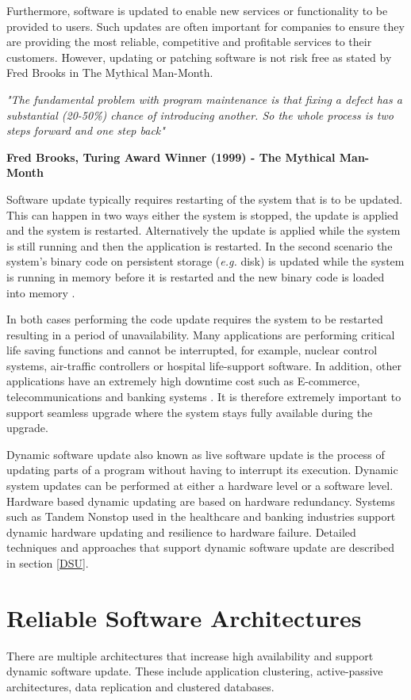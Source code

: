 \documentclass[a4paper,11pt,twoside]{report}
\begin{document}
Furthermore, software is updated to enable new services or functionality to be provided to users. Such updates are often important for companies to ensure they are providing the most reliable, competitive and profitable services to their customers. However, updating or patching software is not risk free as stated by Fred Brooks in The Mythical Man-Month.\bigskip

\noindent\textit{ "The fundamental problem with program maintenance is that fixing a defect has a substantial (20-50\%) chance of introducing another. So the whole process is two steps forward and one step back"}  

\hfill \textbf{Fred Brooks, Turing Award Winner (1999) -  The Mythical Man-Month}\bigskip

Software update typically requires restarting of the system that is to be updated. This can happen in two ways either the system is stopped, the update is applied and the system is restarted. Alternatively the update is applied while the system is still running and then the application is restarted. In the second scenario the system's binary code on persistent storage (\textit{e.g.} disk) is updated while the system is running in memory before it is restarted and the new binary code is loaded into memory \cite{Java}. 

In both cases performing the code update requires the system to be restarted resulting in a period of unavailability. Many applications are performing critical life saving functions and cannot be interrupted, for example, nuclear control systems, air-traffic controllers or hospital life-support software. In addition, other applications have an extremely high downtime cost such as E-commerce, telecommunications and banking systems \cite{fly}. It is therefore extremely important to support seamless upgrade where the system stays fully available during the upgrade. 

Dynamic software update also known as live software update is the process of updating parts of a program without having to interrupt its execution. Dynamic system updates can be performed at either a hardware level or a software level. Hardware based dynamic updating are based on hardware redundancy. Systems such as Tandem Nonstop \cite{Tandem} used in the healthcare and banking industries support dynamic hardware updating and resilience to hardware failure. Detailed techniques and approaches that support dynamic software update are described in section \ref{DSU}. 


\section{Reliable Software Architectures} \label{Architectures}
There are multiple architectures that increase high availability and support dynamic software update. These include application clustering, active-passive architectures, data replication and clustered databases.
\end{document}
